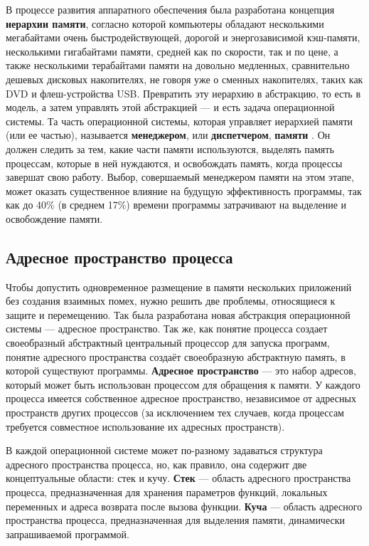 В процессе развития аппаратного обеспечения была разработана концепция \textbf{иерархии памяти}, согласно которой компьютеры обладают несколькими мегабайтами очень быстродействующей, дорогой и энергозависимой кэш-памяти, несколькими гигабайтами памяти, средней как по скорости, так и по цене, а также несколькими терабайтами памяти на довольно медленных, сравнительно дешевых дисковых накопителях, не говоря уже о сменных накопителях, таких как DVD и флеш-устройства USB. Превратить эту иерархию в абстракцию, то есть в модель, а затем управлять этой абстракцией --- и есть задача операционной системы. Та часть операционной системы, которая управляет иерархией памяти (или ее частью), называется \textbf{менеджером}, или \textbf{диспетчером}, \textbf{памяти} \cite{tannenbaum}. Он должен следить за тем, какие части памяти используются, выделять память процессам, которые в ней нуждаются, и освобождать память, когда процессы завершат свою работу. Выбор, совершаемый менеджером памяти на этом этапе, может оказать существенное влияние на будущую эффективность программы, так как до 40\% (в среднем 17\%) времени программы затрачивают на выделение и освобождение памяти. \cite{cornell}

\subsection{Адресное пространство процесса}

Чтобы допустить одновременное размещение в памяти нескольких приложений без создания взаимных помех, нужно решить две проблемы, относящиеся к защите и перемещению. Так была разработана новая абстракция операционной системы --- адресное пространство. Так же, как понятие процесса создает своеобразный абстрактный центральный процессор для запуска программ, понятие адресного пространства создаёт своеобразную абстрактную память, в которой существуют программы. \textbf{Адресное пространство} \cite{tannenbaum} --- это набор адресов, который может быть использован процессом для обращения к памяти. У каждого процесса имеется собственное адресное пространство, независимое от адресных пространств других процессов (за исключением тех случаев, когда процессам требуется совместное использование их адресных пространств).

В каждой операционной системе может по-разному задаваться структура адресного пространства процесса, но, как правило, она содержит две концептуальные области: стек и кучу. \textbf{Стек} \cite{windows} --- область адресного пространства процесса, предназначенная для хранения параметров функций, локальных переменных и адреса возврата после вызова функции. \textbf{Куча} \cite{linux} --- область адресного пространства процесса, предназначенная для выделения памяти, динамически запрашиваемой программой.

